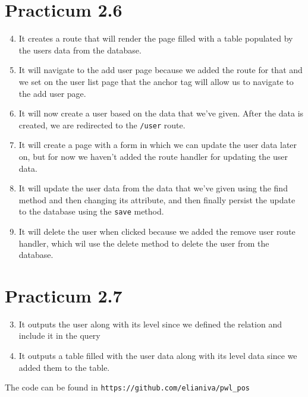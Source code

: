 \documentclass[12pt,titlepage]{article}
\begin{document}
\section{Practicum 2.6}
\begin{enumerate}
    \setcounter{enumi}{3}
    \item {
        It creates a route that will render the page filled with a table populated by the users
        data from the database.
    }
    \setcounter{enumi}{7}
    \item {
        It will navigate to the add user page because we added the route for that and we set on the user list page
        that the anchor tag will allow us to navigate to the add user page.
    }
    \setcounter{enumi}{10}
    \item {
        It will now create a user based on the data that we've given. After the data is created, we are redirected to the
        \texttt{/user} route.
    }
    \setcounter{enumi}{13}
    \item {
        It will create a page with a form in which we can update the user data later on, but for now we haven't added the route handler for
        updating the user data.
    }
    \setcounter{enumi}{16}
    \item {
        It will update the user data from the data that we've given using the find method and then changing its attribute,
        and then finally persist the update to the database using the \texttt{save} method.
    }
    \setcounter{enumi}{18}
    \item {
        It will delete the user when clicked because we added the remove user route handler,
        which wil use the delete method to delete the user from the database.
    }
\end{enumerate}

\section{Practicum 2.7}
\begin{enumerate}
    \setcounter{enumi}{2}
    \item {
        It outputs the user along with its level since we defined the relation and include it in the query
    }
    \setcounter{enumi}{5}
    \item {
        It outputs a table filled with the user data along with its level data since we added them to the table.
    }
\end{enumerate}

The code can be found in \texttt{https://github.com/elianiva/pwl\_pos}
\end{document}
